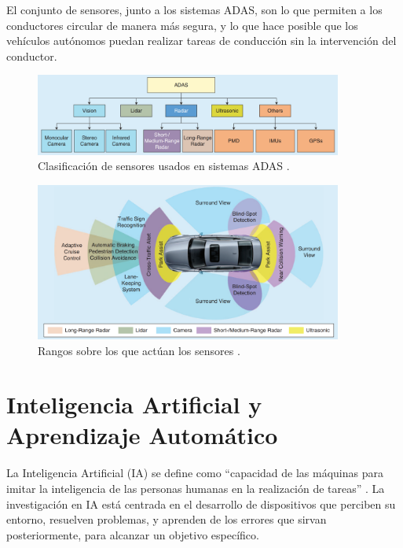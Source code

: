 \documentclass[12pt]{report} %
\begin{document}
El conjunto de sensores, junto a los sistemas ADAS, son lo que permiten a los conductores circular de manera más segura, y lo que hace posible que los vehículos autónomos puedan realizar tareas de conducción sin la intervención del conductor.

\begin{figure}[h]
	\centering
	\includegraphics[width=0.9\textwidth]{adasSensorWorkflow.png}
	\caption{Clasificación de sensores usados en sistemas ADAS \cite{adasSensors}.}
	\label{fig:imagen21}
\end{figure}

\begin{figure}[h]
	\centering
	\includegraphics[width=0.9\textwidth]{adasSensorRange.png}
	\caption{Rangos sobre los que actúan los sensores \cite{adasSensors}.}
	\label{fig:imagen22}
\end{figure}

\section{Inteligencia Artificial y Aprendizaje Automático}

La Inteligencia Artificial (IA) se define como “capacidad de las máquinas para imitar la inteligencia de las personas humanas en la realización de tareas” \cite{deepLearning}. La investigación en IA está centrada en el desarrollo de dispositivos que perciben su entorno, resuelven problemas, y aprenden de los errores que sirvan posteriormente, para alcanzar un objetivo específico.
\end{document}
